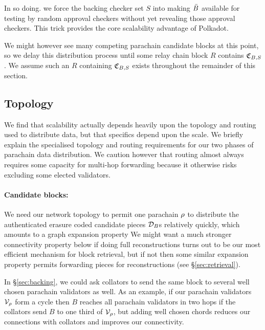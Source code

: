 In so doing. we force the backing checker set $S$ into making $\bar{B}$ available for testing by random approval checkers without yet revealing those approval checkers.  This trick provides the core scalability advantage of Polkadot.

We might however see many competing parachain candidate blocks at this point, so we delay this distribution process until some relay chain block $R$ contains $\mathfrak{C}_{B,S}$.  We assume such an $R$ containing $\mathfrak{C}_{B,S}$ exists throughout the remainder of this section.


\subsection{Topology}
\label{sec:topology}


We find that scalability actually depends heavily upon the topology and routing used to distribute data, but that specifics depend upon the scale.  We briefly explain the specialised topology and routing requirements for our two phases of parachain data distribution.  We caution however that routing almost always requires some capacity for multi-hop forwarding because it otherwise risks excluding some elected validators.  

\smallskip
\paragraph{Candidate blocks:}

We need our network topology to permit one parachain $\rho$ to distribute the authenticated erasure coded candidate pieces $\mathcal{D}_B$s relatively quickly, which amounts to a graph expansion property
We might want a much stronger connectivity property below if doing full reconstructions turns out to be our most efficient mechanism for block retrieval, but if not then some similar expansion property permits forwarding pieces for reconstructions (see \S\ref{sec:retrieval}).

In \S\ref{sec:backing}, we could ask collators to send the same block to several well chosen parachain validators as well.  As an example, if our parachain validators $\mathcal{V}_{\rho}$ form a cycle then $B$ reaches all parachain validators in two hops if the collators send $B$ to one third of $\mathcal{V}_{\rho}$, but adding well chosen chords reduces our connections with collators and improves our connectivity.  

